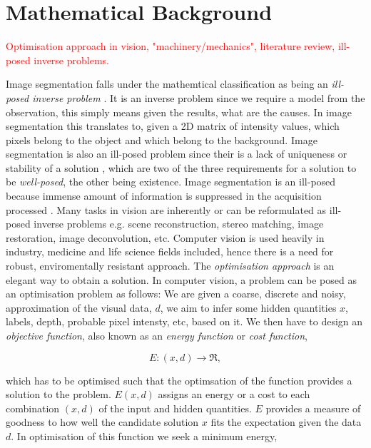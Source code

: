 
\chapter{Mathematical Background} %

\label{chap:Chapter3} %

\textcolor{red}{Optimisation approach in vision, "machinery/mechanics", literature review, ill-posed inverse problems.}

Image segmentation falls under the mathemtical classification as being an \textit{ill-posed inverse problem} \citep{Poggio1985,Terzopoulos1986}.
It is an inverse problem since we require a model from the observation, this simply means given the results, what are the causes.
In image segmentation this translates to, given a 2D matrix of intensity values, which pixels belong to the object and which belong to the background.
Image segmentation is also an ill-posed problem since their is a lack of uniqueness or stability of a solution \citep{Kabanikhin2008}, which are two of the three requirements for a solution to be \textit{well-posed}, the other being existence.
Image segmentation is an ill-posed because immense amount of information is suppressed in the acquisition processed \citep{Tarantola2005,Bertero1998,Bertero2006}.
Many tasks in vision are inherently or can be reformulated as ill-posed inverse problems e.g. scene reconstruction, stereo matching, image restoration, image deconvolution, etc.
Computer vision is used heavily in industry, medicine and life science fields included, hence there is a need for robust, enviromentally resistant approach.
The \textit{optimisation approach} is an elegant way to obtain a solution.
In computer vision, a problem can be posed as an optimisation problem as follows: We are given a coarse, discrete and noisy, approximation of the visual data, $d$, we aim to infer some hidden quantities $x$, labels, depth, probable pixel intensty, etc, based on it.
We then have to design an \textit{objective function}, also known as an \textit{energy function} or \textit{cost function},

\begin{equation}
	E:(x,d) \rightarrow \Re,
\end{equation}

which has to be optimised such that the optimsation of the function provides a solution to the problem.
$E(x,d)$ assigns an energy or a cost to each combination $(x,d)$ of the input and hidden quantities.
$E$ provides a measure of goodness to how well the candidate solution $x$ fits the expectation given the data $d$.
In optimisation of this function we seek a minimum energy,

